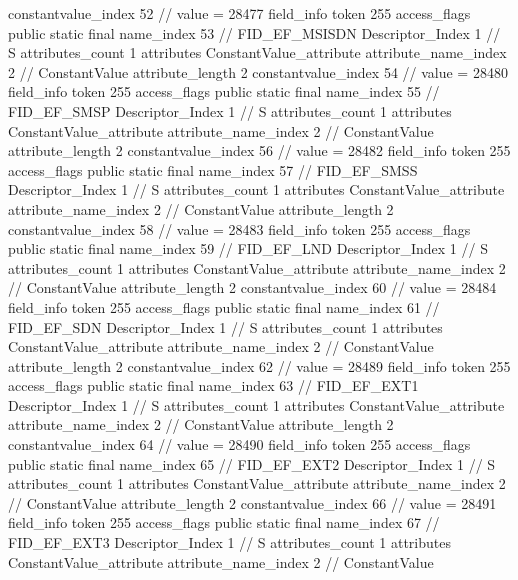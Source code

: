 {{{{{{{					constantvalue_index	52		// value = 28477
				}
				}
			}
			field_info {
				token	255
				access_flags	public static final
				name_index	53		// FID_EF_MSISDN
				Descriptor_Index	1		// S
				attributes_count	1
				attributes {
				ConstantValue_attribute {
					attribute_name_index	2		// ConstantValue
					attribute_length	2
					constantvalue_index	54		// value = 28480
				}
				}
			}
			field_info {
				token	255
				access_flags	public static final
				name_index	55		// FID_EF_SMSP
				Descriptor_Index	1		// S
				attributes_count	1
				attributes {
				ConstantValue_attribute {
					attribute_name_index	2		// ConstantValue
					attribute_length	2
					constantvalue_index	56		// value = 28482
				}
				}
			}
			field_info {
				token	255
				access_flags	public static final
				name_index	57		// FID_EF_SMSS
				Descriptor_Index	1		// S
				attributes_count	1
				attributes {
				ConstantValue_attribute {
					attribute_name_index	2		// ConstantValue
					attribute_length	2
					constantvalue_index	58		// value = 28483
				}
				}
			}
			field_info {
				token	255
				access_flags	public static final
				name_index	59		// FID_EF_LND
				Descriptor_Index	1		// S
				attributes_count	1
				attributes {
				ConstantValue_attribute {
					attribute_name_index	2		// ConstantValue
					attribute_length	2
					constantvalue_index	60		// value = 28484
				}
				}
			}
			field_info {
				token	255
				access_flags	public static final
				name_index	61		// FID_EF_SDN
				Descriptor_Index	1		// S
				attributes_count	1
				attributes {
				ConstantValue_attribute {
					attribute_name_index	2		// ConstantValue
					attribute_length	2
					constantvalue_index	62		// value = 28489
				}
				}
			}
			field_info {
				token	255
				access_flags	public static final
				name_index	63		// FID_EF_EXT1
				Descriptor_Index	1		// S
				attributes_count	1
				attributes {
				ConstantValue_attribute {
					attribute_name_index	2		// ConstantValue
					attribute_length	2
					constantvalue_index	64		// value = 28490
				}
				}
			}
			field_info {
				token	255
				access_flags	public static final
				name_index	65		// FID_EF_EXT2
				Descriptor_Index	1		// S
				attributes_count	1
				attributes {
				ConstantValue_attribute {
					attribute_name_index	2		// ConstantValue
					attribute_length	2
					constantvalue_index	66		// value = 28491
				}
				}
			}
			field_info {
				token	255
				access_flags	public static final
				name_index	67		// FID_EF_EXT3
				Descriptor_Index	1		// S
				attributes_count	1
				attributes {
				ConstantValue_attribute {
					attribute_name_index	2		// ConstantValue
}}}}}}}
